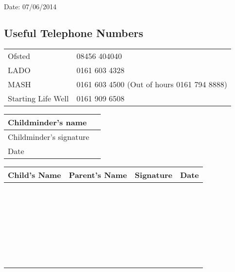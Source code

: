 Date: 07/06/2014

\subsection{Useful Telephone Numbers}

\begin{table}[h]
  \begin{tabularx}{\textwidth}{lX}
    Ofsted & 08456 404040 \\
    LADO & 0161 603 4328 \\
    MASH & 0161 603 4500 (Out of hours 0161 794 8888) \\
    Starting Life Well & 0161 909 6508 \\ 
 \end{tabularx}
\end{table}

\begin{table}[h]
  \def\arraystretch{2.0}
  \begin{tabularx}{\textwidth}{|l|X|}
    \hline
    Childminder's name & \\
    \hline
    Childminder's signature &  \\
    \hline
    Date & \\
    \hline
  \end{tabularx}
\end{table}

\begin{table}[h]
  \def\arraystretch{2.0}
  \begin{tabularx}{\textwidth}{!{\color{gray}\vrule}X!{\color{gray}\vrule}X!{\color{gray}\vrule}X!{\color{gray}\vrule}X!{\color{gray}\vrule}}
    \hline
    Child's Name & Parent's Name & Signature & Date \\
    \hline
    ~ & ~ & ~ & \\
    \hline
    ~ & ~ & ~ & \\
    \hline
    ~ & ~ & ~ & \\
    \hline
    ~ & ~ & ~ & \\
    \hline
    ~ & ~ & ~ & \\
    \hline
    ~ & ~ & ~ & \\
    \hline
  \end{tabularx}
\end{table}


